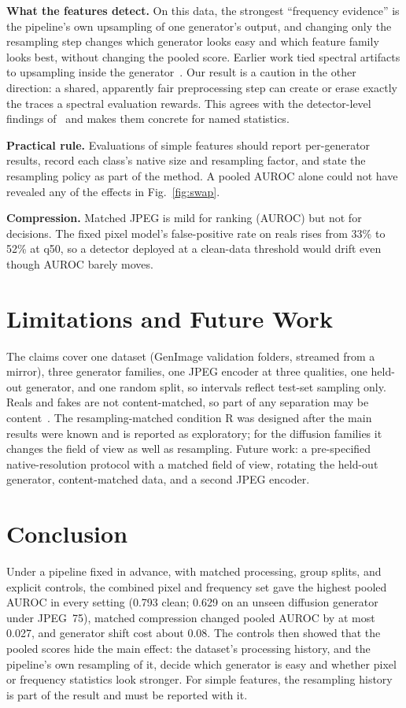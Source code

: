 \documentclass[conference]{IEEEtran}
\begin{document}
\textbf{What the features detect.} On this data, the strongest ``frequency evidence'' is the pipeline's own upsampling of one generator's output, and changing only the resampling step changes which generator looks easy and which feature family looks best, without changing the pooled score. Earlier work tied spectral artifacts to upsampling inside the generator~\cite{frank2020leveraging,durall2020watch,zhang2019artifacts}. Our result is a caution in the other direction: a shared, apparently fair preprocessing step can create or erase exactly the traces a spectral evaluation rewards. This agrees with the detector-level findings of~\cite{grommelt2024fake,guillaro2025bfree,zhou2026fragile} and makes them concrete for named statistics.

\textbf{Practical rule.} Evaluations of simple features should report per-generator results, record each class's native size and resampling factor, and state the resampling policy as part of the method. A pooled AUROC alone could not have revealed any of the effects in Fig.~\ref{fig:swap}.

\textbf{Compression.} Matched JPEG is mild for ranking (AUROC) but not for decisions. The fixed pixel model's false-positive rate on reals rises from 33\% to 52\% at q50, so a detector deployed at a clean-data threshold would drift even though AUROC barely moves.

\section{Limitations and Future Work}

The claims cover one dataset (GenImage validation folders, streamed from a mirror), three generator families, one JPEG encoder at three qualities, one held-out generator, and one random split, so intervals reflect test-set sampling only. Reals and fakes are not content-matched, so part of any separation may be content~\cite{gye2025sfld}. The resampling-matched condition R was designed after the main results were known and is reported as exploratory; for the diffusion families it changes the field of view as well as resampling. Future work: a pre-specified native-resolution protocol with a matched field of view, rotating the held-out generator, content-matched data, and a second JPEG encoder.

\section{Conclusion}

Under a pipeline fixed in advance, with matched processing, group splits, and explicit controls, the combined pixel and frequency set gave the highest pooled AUROC in every setting (0.793 clean; 0.629 on an unseen diffusion generator under JPEG~75), matched compression changed pooled AUROC by at most 0.027, and generator shift cost about 0.08. The controls then showed that the pooled scores hide the main effect: the dataset's processing history, and the pipeline's own resampling of it, decide which generator is easy and whether pixel or frequency statistics look stronger. For simple features, the resampling history is part of the result and must be reported with it.



\end{document}
